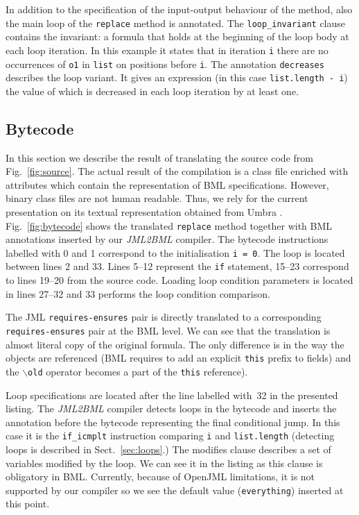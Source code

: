 \documentclass{llncs}
\newcommand{\jmltobmltext}{JML2BML}
\newcommand{\jmltobml}{\textsl{\jmltobmltext}\xspace}
\newcommand{\openjml}{OpenJML\xspace}
\begin{document}
\vspace{-1.5\baselineskip}

In addition to the specification of the input-output beha\-viour of
the method, also the main loop of the \texttt{replace} method is
annotated. The \texttt{loop\_invariant} clause contains the invariant:
a formula that holds at the beginning of the loop body at each
loop iteration. In this example it states that in iteration \texttt{i}
there are no occurrences of \texttt{o1} in \texttt{list} on positions
before \texttt{i}. The annotation \texttt{decreases} describes the
loop variant. It gives an expression (in this case
\verb|list.length - i|) the value of which is decreased in each loop
iteration by at least one.

\subsection{Bytecode}



In this section we describe the result of translating the source code
from Fig.~\ref{fig:source}. The actual result of the compilation is
a class file enriched with attributes which contain the
representation of BML specifications. However, binary class
files are not human readable. Thus, we rely for the current
presentation on its textual representation obtained from Umbra
\cite{bmllib}. Fig.~\ref{fig:bytecode} shows the translated
\texttt{replace} method together with BML annotations inserted by our
\jmltobml compiler. The bytecode instructions labelled with 0 and 1
correspond to the initialisation \texttt{i = 0}. The loop is located
between lines 2 and 33. Lines 5--12 represent the \texttt{if}
statement, 15--23 correspond to lines 19--20 from the source
code. Loading loop condition parameters is located in lines 27--32 and
33 performs the loop condition comparison.

The JML \texttt{requires-ensures} pair is directly translated to a
corresponding \texttt{requires-ensures} pair at the BML level. We can
see that the translation is almost literal copy of the original
formula. The only difference is in the way the objects are referenced
(BML requires to add an explicit \texttt{this} prefix to fields) and the
\texttt{$\backslash$old} operator becomes a part of the \texttt{this}
reference).

Loop specifications are located after the line labelled with~32 in the
presented listing. The \jmltobml compiler detects loops in the
bytecode and inserts the annotation before the bytecode representing
the final conditional jump. In this case it is the \texttt{if\_icmplt}
instruction comparing \texttt{i} and \texttt{list.length} (detecting
loops is described in Sect.~\ref{sec:loops}.) The modifies clause
describes a set of variables modified by the loop. We can see it in
the listing as this clause is obligatory in BML. Currently, because of
\openjml limitations, it is not supported by our compiler so we see
the default value (\texttt{everything}) inserted at this point.
\end{document}
